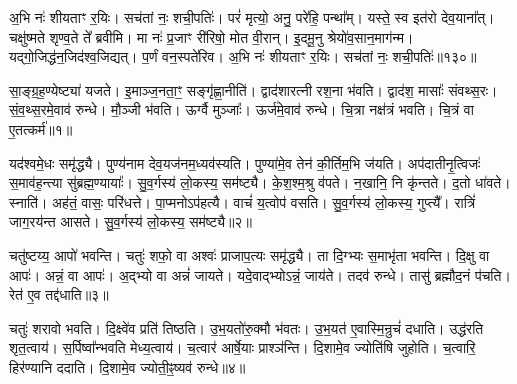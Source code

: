 अ॒भि नः॑ शीयताꣳ र॒यिः।
सच॑तां नः॒ शची॒पतिः॑।
परं॑ मृत्यो॒ अनु॒ परे॑हि॒ पन्था᳚म्।
यस्ते॒ स्व इत॑रो देव॒याना᳚त्।
चक्षु॑ष्मते शृण्व॒ते ते᳚ ब्रवीमि।
मा नः॑ प्र॒जाꣳ री॑रिषो॒ मोत वी॒रान्।
इ॒दमू॒नु श्रेयो॑व॒सान॒माग॑न्म।
यद्गो॒जिद्ध॑न॒जिद॑श्व॒जिद्यत्।
प॒र्णं वन॒स्पते॑रिव।
अ॒भि नः॑ शीयताꣳ र॒यिः।
सच॑तां नः॒ शची॒पतिः॑॥१३०॥\anuvakamend[वन॒स्पता॑व॒द्भ्यो लो॒का द॑धिरे॒ तेज॑ इन्द्रि॒यं धामा॑शीमहीवा॒भिनः॑ शीयताꣳ र॒यिरेकं॑ च]




\clearpage
{}
\setcounter{anuvakam}{0}

सा॒ङ्ग्र॒ह॒ण्येष्ट्या॑ यजते।
इ॒माञ्ज॒नता॒ꣳ॒ सङ्गृ॑ह्णा॒नीति॑।
द्वाद॑शारत्नी रश॒ना भ॑वति।
द्वाद॑श॒ मासाः᳚ संवथ्स॒रः।
सं॒व॒थ्स॒रमे॒वाव॑ रुन्धे।
मौ॒ञ्जी भ॑वति।
ऊर्ग्वै मुञ्जाः᳚।
ऊर्ज॑\-मे॒वाव॑ रुन्धे।
चि॒त्रा नक्ष॑त्रं भवति।
चि॒त्रं वा ए॒तत्कर्म॑॥१॥

यद॑श्वमे॒धः समृ॑द्ध्यै।
पुण्य॑नाम देव॒यज॑नम॒ध्यव॑स्यति।
पुण्या॑मे॒व तेन॑ की॒र्तिम॒भि ज॑यति।
अप॑दातीनृ॒त्विजः॑ स॒माव॑ह॒न्त्या सु॑ब्रह्म॒ण्यायाः᳚।
सु॒व॒र्गस्य॑ लो॒कस्य॒ सम॑ष्ट्यै।
के॒श॒श्म॒श्रु व॑पते।
न॒खानि॒ नि कृ॑न्तते।
द॒तो धा॑वते।
स्नाति॑।
अह॑तं॒ वासः॒ परि॑धत्ते।
पा॒प्मनो\-ऽप॑हत्यै।
वाचं॑ य॒त्वोप॑ वसति।
सु॒व॒र्गस्य॑ लो॒कस्य॒ गुप्त्यै᳚।
रात्रिं॑ जाग॒रय॑न्त आसते।
सु॒व॒र्गस्य॑ लो॒कस्य॒ सम॑ष्ट्यै॥२॥\anuvakamend[कर्म॑ धत्ते॒ पञ्च॑ च]

चतु॑ष्टय्य॒ आपो॑ भवन्ति।
चतुः॑ शफो॒ वा अश्वः॑ प्राजाप॒त्यः समृ॑द्ध्यै।
ता दि॒ग्भ्यः स॒माभृ॑ता भवन्ति।
दि॒क्षु वा आपः॑।
अन्नं॒ वा आपः॑।
अ॒द्भ्यो वा अन्नं॑ जायते।
यदे॒वाद्भ्यो\-ऽन्नं॒ जाय॑ते।
तदव॑ रुन्धे।
तासु॑ ब्रह्मौद॒नं प॑चति।
रेत॑ ए॒व तद्द॑धाति॥३॥

चतुः॑ शरावो भवति।
दि॒क्ष्वे॑व प्रति॑ तिष्ठति।
उ॒भ॒यतो॑रु॒क्मौ भ॑वतः।
उ॒भ॒यत॑ ए॒वास्मि॒न्रुचं॑ दधाति।
उद्ध॑रति शृत॒त्वाय॑।
स॒र्पिष्वा᳚न्भवति मेध्य॒त्वाय॑।
च॒त्वार॑ आर्\mbox{}षे॒याः प्राश्ञ॑न्ति।
दि॒शामे॒व ज्योति॑षि जुहोति।
च॒त्वारि॒ हिर॑ण्यानि ददाति।
दि॒शामे॒व ज्योती॒ꣴ॒ष्यव॑ रुन्धे॥४॥


